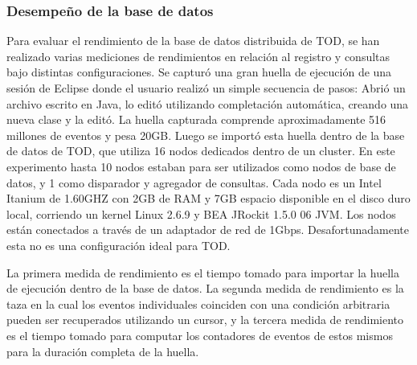 \documentclass[12pt,legalpaper]{report}
\begin{document}
			\subsubsection{Desempeño de la base de datos}


Para evaluar el rendimiento de la base de datos distribuida de TOD, se han realizado varias mediciones de rendimientos en relación al registro y consultas bajo distintas configuraciones.  Se capturó una gran huella de ejecución de una sesión de Eclipse donde el usuario realizó un simple secuencia de pasos: Abrió un archivo escrito en Java, lo editó utilizando completación automática, creando una nueva clase y la editó. La huella capturada comprende aproximadamente 516 millones de eventos y pesa 20GB.  Luego se importó esta huella dentro de la base de datos de TOD, que utiliza 16 nodos dedicados dentro de un cluster.  En este experimento hasta 10 nodos estaban para ser utilizados como nodos de base de datos, y 1 como disparador y agregador de consultas.  Cada nodo es un Intel Itanium de 1.60GHZ con 2GB de RAM y 7GB espacio disponible en el disco duro local, corriendo un kernel Linux 2.6.9 y BEA JRockit 1.5.0 06 JVM.  Los nodos están conectados a través de un adaptador de red de 1Gbps.  Desafortunadamente esta no es una configuración ideal para TOD.

La primera medida de rendimiento es el tiempo tomado para importar la huella de ejecución dentro de la base de datos.  La segunda medida de rendimiento es la taza en la cual los eventos individuales coinciden con una condición arbitraria pueden ser recuperados utilizando un cursor, y la tercera medida de rendimiento es el tiempo tomado para computar los contadores de eventos de estos mismos para la duración completa de la huella.
\end{document}
